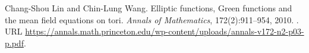 Chang-Shou Lin and Chin-Lung Wang.
\newblock Elliptic functions, Green functions and the mean field equations on tori.
\newblock \emph{Annals of Mathematics}, 172(2):911--954, 2010.
\newblock {}.
\newblock URL
\url{https://annals.math.princeton.edu/wp-content/uploads/annals-v172-n2-p03-p.pdf}.

